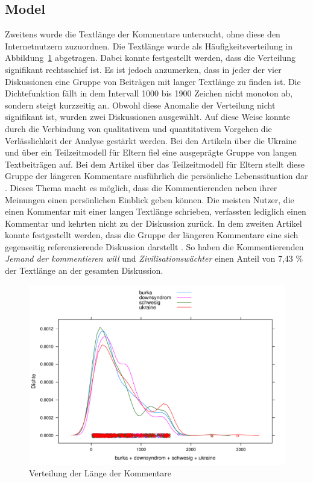\documentclass[12pt,a4paper,oneside]{article}
\begin{document}
\begin{titlepage}
\begin{flushleft}
\section{Model}
Zweitens wurde die Textlänge der Kommentare untersucht, ohne diese den Internetnutzern zuzuordnen. Die Textlänge wurde als Häufigkeitsverteilung in Abbildung~\ref{fig:kommentar-density} abgetragen. Dabei konnte festgestellt werden, dass die Verteilung signifikant rechtsschief ist. Es ist jedoch anzumerken, dass in jeder der vier Diskussionen eine Gruppe von Beiträgen mit langer Textlänge zu finden ist. Die Dichtefunktion fällt in dem Intervall 1000 bis 1900 Zeichen nicht monoton ab, sondern steigt kurzzeitig an. Obwohl diese Anomalie der Verteilung nicht signifikant ist, wurden zwei Diskussionen ausgewählt. Auf diese Weise konnte durch die Verbindung von qualitativem und quantitativem Vorgehen die Verlässlichkeit der Analyse gestärkt werden. Bei den Artikeln über die Ukraine und über ein Teilzeitmodell für Eltern fiel eine ausgeprägte Gruppe von langen Textbeiträgen auf. Bei dem Artikel über das Teilzeit\-modell für Eltern stellt diese Gruppe der längeren Kommentare ausführlich die persönliche Lebenssituation dar \cite{Zeit-2-2014Zeit}. Dieses Thema macht es möglich, dass die Kommentierenden neben ihrer Meinungen einen persönlichen Einblick geben können. Die meisten Nutzer, die einen Kommentar mit einer langen Textlänge schrieben, verfassten lediglich einen Kommentar und kehrten nicht zu der Diskussion zurück. In dem zweiten Artikel konnte festgestellt werden, dass die Gruppe der längeren Kommentare eine sich gegenseitig referenzierende Diskussion darstellt \cite{Greven2014Zeit}. So haben die Kommentierenden \textit{Jemand der kommentieren will} und \textit{Zivilisationswächter} einen Anteil von 7,43 \% der Textlänge an der gesamten Diskussion.

\begin{figure}[h!]
\includegraphics[width=.90\textwidth]{density_textlaenge.pdf}
\caption{Verteilung der Länge der Kommentare}
\label{fig:kommentar-density}
\end{figure}



\end{flushleft}
\end{titlepage}
\end{document}
